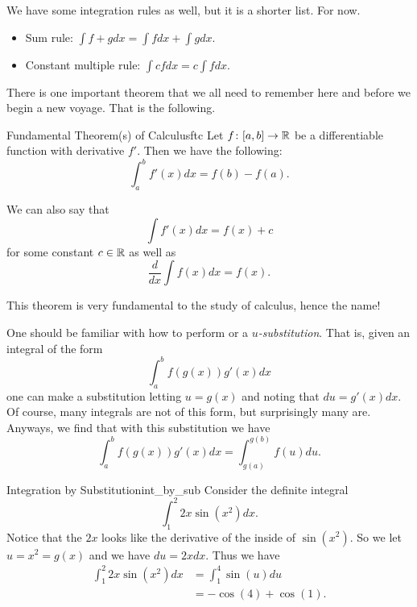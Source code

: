     We have some integration rules as well, but it is a shorter list. For now.
    \begin{itemize}
        \item Sum rule: $\displaystyle{\int f + g dx=\int f dx + \int g dx}$.
        \item Constant multiple rule: $\displaystyle{\int cf dx = c \int f dx}$.
    \end{itemize}

    There is one important theorem that we all need to remember here and before we begin a new voyage.  That is the following.

    \begin{thm}{Fundamental Theorem(s) of Calculus}{ftc}
    Let $f\colon [a,b] \to \mathbb{R}$ be a differentiable function with derivative $f'$.  Then we have the following:
    \[
    \int_a^b f'(x)dx = f(b)-f(a).
    \]

    We can also say that
    \[
    \int f'(x)dx = f(x)+c
    \]
    for some constant $c\in \mathbb{R}$ as well as
    \[
    \frac{d}{dx} \int f(x)dx = f(x).
    \]
    \end{thm}
    \noindent This theorem is very fundamental to the study of calculus, hence the name!

    One should be familiar with how to perform  or a \emph{$u$-substitution}. That is, given an integral of the form
    \[
    \int_a^b f(g(x))g'(x)dx
    \]
    one can make a substitution letting $u=g(x)$ and noting that $du=g'(x)dx$.  Of course, many integrals are not of this form, but surprisingly many are. Anyways, we find that with this substitution we have
    \[
    \int_a^b f(g(x))g'(x)dx= \int_{g(a)}^{g(b)}f(u)du.
    \]

    \begin{ex}{Integration by Substitution}{int_by_sub}
        Consider the definite integral
        \[
        \int_1^2 2x\sin\left(x^2\right)dx.
        \]
        Notice that the $2x$ looks like the derivative of the inside of $\sin\left(x^2\right)$.  So we let $u=x^2=g(x)$ and we have $du=2xdx$. Thus we have
        \begin{align*}
            \int_1^2 2x\sin\left( x^2\right)dx &= \int_1^4 \sin(u)du\\
            &= -\cos(4)+\cos(1).
        \end{align*}
    \end{ex}

